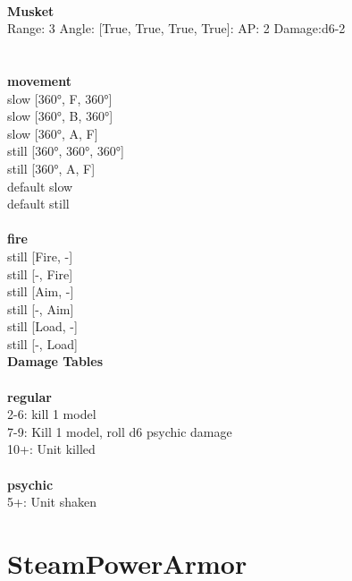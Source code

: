 \ \\
{\bf Musket } \\



Range: 3  Angle: [True, True, True, True]: AP: 2 Damage:d6-2 \\




 
\ \\



\ \\ {\bf movement } \\
slow [360°, F, 360°] \\
slow [360°, B, 360°] \\
slow [360°, A, F] \\
still [360°, 360°, 360°] \\
still [360°, A, F] \\
default slow \\
default still \\
\ \\ {\bf fire } \\
still [Fire, -] \\
still [-, Fire] \\
still [Aim, -] \\
still [-, Aim] \\
still [Load, -] \\
still [-, Load] \\


{\bf Damage Tables} \\
\ \\ {\bf regular } \\
2-6: kill 1 model \\
7-9: Kill 1 model, roll d6 psychic damage \\
10+: Unit killed \\
\ \\ {\bf psychic } \\
5+: Unit shaken \\










\pagebreak\pagebreak

\section{ SteamPowerArmor }

